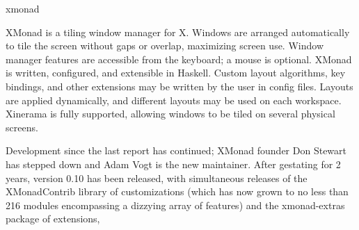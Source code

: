 \begin{hcarentry}[updated]{xmonad}
\label{xmonad}
\makeheader

XMonad is a tiling window manager for X. Windows are arranged
automatically to tile the screen without gaps or overlap, maximizing
screen use. Window manager features are accessible from the keyboard; a
mouse is optional. XMonad is written, configured, and extensible in
Haskell. Custom layout algorithms, key bindings, and other extensions may
be written by the user in config files. Layouts are applied
dynamically, and different layouts may be used on each workspace.
Xinerama is fully supported, allowing windows to be tiled on several
physical screens.

Development since the last report has continued; XMonad founder Don Stewart
has stepped down and Adam Vogt is the new maintainer.
After gestating for 2 years, version 0.10 has been released, with simultaneous
releases of the XMonadContrib library of customizations (which has now grown to
no less than 216 modules encompassing a dizzying array of features) and the
xmonad-extras package of extensions,


\end{hcarentry}
